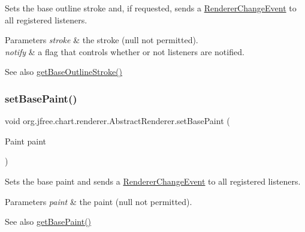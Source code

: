 Sets the base outline stroke and, if requested, sends a \mbox{\hyperlink{}{Renderer\+Change\+Event}} to all registered listeners.


\begin{DoxyParams}{Parameters}
{\em stroke} & the stroke ({\ttfamily null} not permitted). \\
\hline
{\em notify} & a flag that controls whether or not listeners are notified.\\
\hline
\end{DoxyParams}
\begin{DoxySeeAlso}{See also}
\mbox{\hyperlink{classorg_1_1jfree_1_1chart_1_1renderer_1_1_abstract_renderer_a8a73309c5c596b38434a7c3cbbc6f8e3}{get\+Base\+Outline\+Stroke()}} 
\end{DoxySeeAlso}
\mbox{\label{classorg_1_1jfree_1_1chart_1_1renderer_1_1_abstract_renderer_aa52fbb777d55d74a89d024d2a46dc794}} 
\subsubsection{\texorpdfstring{set\+Base\+Paint()}{setBasePaint()}\hspace{0.1cm}{\footnotesize\ttfamily [1/2]}}
{\footnotesize\ttfamily void org.\+jfree.\+chart.\+renderer.\+Abstract\+Renderer.\+set\+Base\+Paint (\begin{DoxyParamCaption}\item[{Paint}]{paint }\end{DoxyParamCaption})}

Sets the base paint and sends a \mbox{\hyperlink{}{Renderer\+Change\+Event}} to all registered listeners.


\begin{DoxyParams}{Parameters}
{\em paint} & the paint ({\ttfamily null} not permitted).\\
\hline
\end{DoxyParams}
\begin{DoxySeeAlso}{See also}
\mbox{\hyperlink{classorg_1_1jfree_1_1chart_1_1renderer_1_1_abstract_renderer_a856d21345f9547c9ea9666db2c4928a2}{get\+Base\+Paint()}} 
\end{DoxySeeAlso}
\mbox{\label{classorg_1_1jfree_1_1chart_1_1renderer_1_1_abstract_renderer_acf4a3eec1a0e25b2e6d034fc3f0aaaf7}} 

